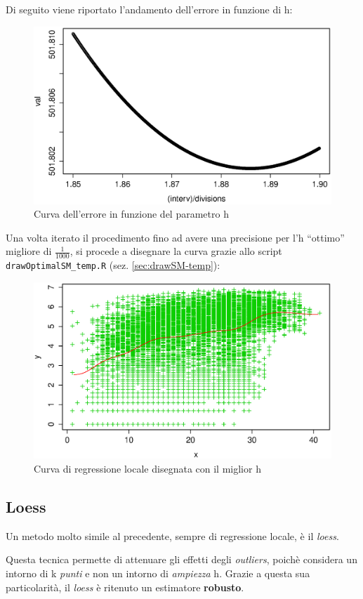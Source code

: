 Di seguito viene riportato l'andamento dell'errore in funzione di h:

\begin{figure}[H]
  \centering
  \includegraphics[width=.7\columnwidth]{images/non-linear/sm-optimal-h.eps}
  \caption{Curva dell'errore in funzione del parametro h}
  \label{fig:sm-optimal-h}
\end{figure}

Una volta iterato il procedimento fino ad avere una precisione per l'h
``ottimo'' migliore di $ \frac{1}{1000} $, si procede a disegnare la curva
grazie allo script \texttt{drawOptimalSM\_temp.R} (sez. \ref{sec:drawSM-temp}):

\begin{figure}[H]
  \centering
  \includegraphics[width=.7\columnwidth]{images/non-linear/sm-draw.eps}
  \caption{Curva di regressione locale disegnata con il miglior h}
  \label{fig:sm-draw}
\end{figure}


\subsection{Loess}\label{sec:loess}
Un metodo molto simile al precedente, sempre di regressione locale, è il
\emph{loess}.

Questa tecnica permette di attenuare gli effetti degli \emph{outliers}, poichè
considera un intorno di k \emph{punti} e non un intorno di \emph{ampiezza} h.
Grazie a questa sua particolarità, il \emph{loess} è ritenuto un estimatore
\textbf{robusto}.

